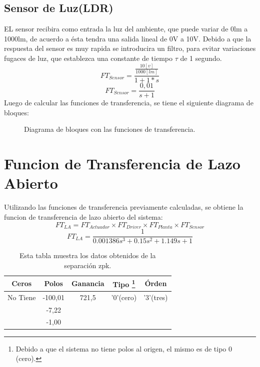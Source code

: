 \documentclass[a4paper,11pt]{article}
\begin{document}
\subsection{Sensor de Luz(LDR)}
EL sensor recibira como entrada la luz del ambiente, que puede variar de 0lm a 1000lm, de acuerdo a ésta tendra una salida lineal de 0V a 10V. Debido a que la respuesta del sensor es muy rapida se introducira un filtro, para evitar variaciones fugaces de luz, que establezca una constante de tiempo  $\tau$ de 1 segundo.
$$FT_{Sensor}=\frac{\frac{10[v]}{1000[lm]}}{1+1*s}$$
$$FT_{Sensor}=\frac{0,01}{s+1}$$
Luego de calcular las funciones de transferencia, se tiene el siguiente diagrama de bloques:
  \begin{figure}[H] %
	\caption{Diagrama de bloques con las funciones de transferencia.}
	\label{fig:diagrama2}
	\end{figure} 
\section{Funcion de Transferencia de Lazo Abierto}
Utilizando las funciones de transferencia previamente calculadas, se obtiene la funcion de transferencia de lazo abierto del sistema:
$$FT_{LA}=FT_{Actuador} \times FT_{Driver} \times FT_{Planta} \times FT_{Sensor} $$
$$FT_{LA}=\frac{1}{0.001386s^3 + 0.15 s^2 + 1.149 s + 1}$$
\begin{table}[h!]
\centering
\caption{Esta tabla muestra los datos obtenidos de la separación zpk.}
\begin{tabular}{|ccccc|}
\hline 
Ceros & Polos & Ganancia & Tipo \footnote{Debido a que el sistema no tiene polos al origen, el mismo es de tipo 0 (cero).} & Órden \tabularnewline
\hline 
\hline 
 No Tiene & -100,01 & 721,5 & '0'(cero) & '3'(tres) \tabularnewline
 & -7,22 & & &\tabularnewline
 & -1,00 & & &\tabularnewline
\hline 
\end{tabular}
\end{table}
\end{document}
